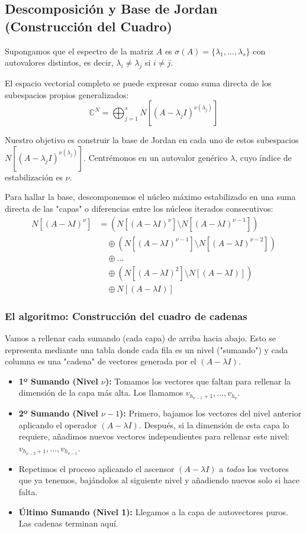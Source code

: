 \subsection{Descomposición y Base de Jordan (Construcción del Cuadro)}

Supongamos que el espectro de la matriz $A$ es $\sigma(A)=\{\lambda_1, \dots, \lambda_s\}$ con autovalores distintos, es decir, $\lambda_i \neq \lambda_j$ si $i \neq j$. 

El espacio vectorial completo se puede expresar como suma directa de los subespacios propios generalizados:
\[
    \mathbb{C}^N = \bigoplus_{j=1}^s N[(A-\lambda_j I)^{\nu(\lambda_j)}]
\]

Nuestro objetivo es construir la base de Jordan en cada uno de estos subespacios $N[(A-\lambda_j I)^{\nu(\lambda_j)}]$. Centrémonos en un autovalor genérico $\lambda$, cuyo índice de estabilización es $\nu$.

Para hallar la base, descomponemos el núcleo máximo estabilizado en una suma directa de las "capas" o diferencias entre los núcleos iterados consecutivos:
\begin{align*}
    N[(A-\lambda I)^\nu] &= \left( N[(A-\lambda I)^\nu] \setminus N[(A-\lambda I)^{\nu-1}] \right) \\
    &\quad \oplus \left( N[(A-\lambda I)^{\nu-1}] \setminus N[(A-\lambda I)^{\nu-2}] \right) \\
    &\quad \oplus \dots \\
    &\quad \oplus \left( N[(A-\lambda I)^2] \setminus N[(A-\lambda I)] \right) \\
    &\quad \oplus N[(A-\lambda I)]
\end{align*}

\subsubsection*{El algoritmo: Construcción del cuadro de cadenas}

Vamos a rellenar cada sumando (cada capa) de arriba hacia abajo. Esto se representa mediante una tabla donde cada fila es un nivel ("sumando") y cada columna es una "cadena" de vectores generada por el $(A-\lambda I)$.

\begin{itemize}
    \item \textbf{1º Sumando (Nivel $\nu$):} Tomamos los vectores que faltan para rellenar la dimensión de la capa más alta. Los llamamos $v_{h_{\nu-1}+1}, \dots, v_{h_\nu}$.
    \item \textbf{2º Sumando (Nivel $\nu-1$):} Primero, bajamos los vectores del nivel anterior aplicando el operador $(A-\lambda I)$. Después, si la dimensión de esta capa lo requiere, añadimos nuevos vectores independientes para rellenar este nivel: $v_{h_{\nu-2}+1}, \dots, v_{h_{\nu-1}}$.
    \item Repetimos el proceso aplicando el ascensor $(A-\lambda I)$ a \textit{todos} los vectores que ya tenemos, bajándolos al siguiente nivel y añadiendo nuevos solo si hace falta.
    \item \textbf{Último Sumando (Nivel 1):} Llegamos a la capa de autovectores puros. Las cadenas terminan aquí.
\end{itemize}

